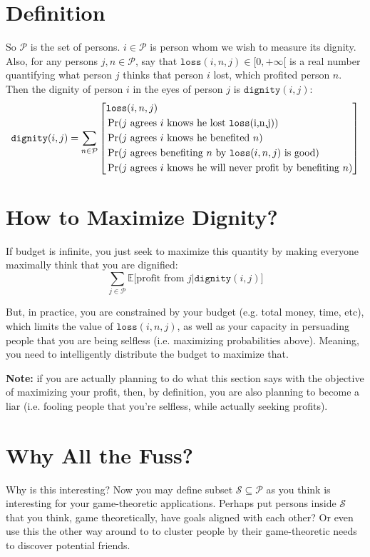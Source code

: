 \documentclass{report}
\begin{document}
\section{Definition}
So $\mathcal{P}$ is the set of persons. $i \in \mathcal{P}$ is person whom we
wish to measure its dignity.  Also, for any persons $j,n \in \mathcal{P}$, say
that $\texttt{loss}(i,n,j) \in [0, +\infty[$ is a real number quantifying what
person $j$ thinks that person $i$ lost, which profited person $n$. Then the
dignity of person $i$ in the eyes of person $j$ is $\texttt{dignity}(i,j)$:
\[
\texttt{dignity}(i,j) = 
\sum_{n \in \mathcal{P}}
\left[
\begin{split}
&\texttt{loss}(i,n,j)\\
&\Pr(\text{$j$ agrees $i$ knows he lost \texttt{loss}(i,n,j)})\\
&\Pr(\text{$j$ agrees $i$ knows he benefited $n$})\\
&\Pr(\text{$j$ agrees benefiting $n$ by $\texttt{loss}(i,n,j)$ is good})\\
&\Pr(\text{$j$ agrees $i$ knows he will never profit by benefiting $n$})\\
\end{split}
\right]
\]

\section{How to Maximize Dignity?}
If budget is infinite, you just seek to maximize this quantity by making
everyone maximally think that you are dignified:
\[
\sum_{j \in \mathcal{P}}
\mathbb{E}\big[
    \text{profit from $j$} 
    \big|
    \texttt{dignity}(i,j)
\big]
\]

But, in practice, you are constrained by your budget (e.g. total money,
time, etc), which limits the value of $\texttt{loss}(i,n,j)$, as well as your
capacity in persuading people that you are being selfless (i.e. maximizing
probabilities above). Meaning, you need to intelligently distribute the budget
to maximize that. 

\textbf{Note:} if you are actually planning to do what this section says with
the objective of maximizing your profit, then, by definition, you are also
planning to become a liar (i.e. fooling people that you're selfless, while
actually seeking profits).

\section{Why All the Fuss?}
Why is this interesting? Now you may define subset $\mathcal{S} \subseteq
\mathcal{P}$ as you think
is interesting for your game-theoretic applications. Perhaps put persons inside
$\mathcal{S}$ that you think, game theoretically, have goals aligned with each
other? Or even use this the other way around to to cluster people by their
game-theoretic needs to discover potential friends.
\end{document}
